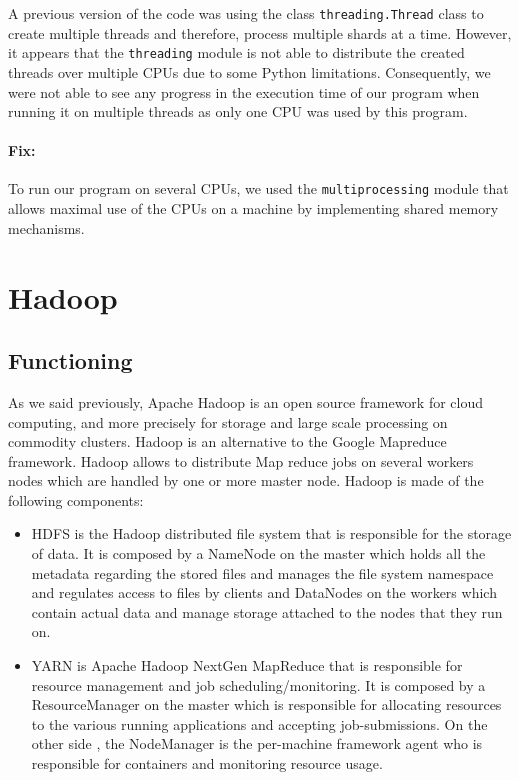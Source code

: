 \documentclass{article}
\begin{document}
A previous version of the code was using the class \lstinline|threading.Thread| class to create multiple threads and therefore, process multiple shards at a time. However, it appears that the \lstinline|threading| module is not able to distribute the created threads over multiple CPUs due to some Python limitations. Consequently, we were not able to see any progress in the execution time of our program when running it on multiple threads as only one CPU was used by this program.

\paragraph{Fix: }

To run our program on several CPUs, we used the \lstinline|multiprocessing| module that allows maximal use of the CPUs on a machine by implementing shared memory mechanisms.


\section{Hadoop}

\subsection{Functioning}
As we said previously, Apache Hadoop is an open source framework for cloud computing, and more precisely for storage and large scale processing on commodity clusters. Hadoop is an alternative to the Google Mapreduce framework. Hadoop allows to distribute Map reduce jobs on several workers nodes which are handled by one or more master node. Hadoop is made of the following components:

\begin{itemize}
  \item HDFS is the Hadoop distributed file system that is responsible for the storage of data. It is composed by a NameNode on the master which holds all the metadata regarding the stored files and manages the file system namespace and regulates access to files by clients and DataNodes on the workers which contain actual data and manage storage attached to the nodes that they run on.
  \item YARN is Apache Hadoop NextGen MapReduce that is responsible for resource management and job scheduling/monitoring. It is composed by a ResourceManager on the master which is responsible for allocating resources to the various running applications and accepting job-submissions. On the other side , the NodeManager  is the per-machine framework agent who is responsible for containers and monitoring resource usage.
\end{itemize}
\end{document}
